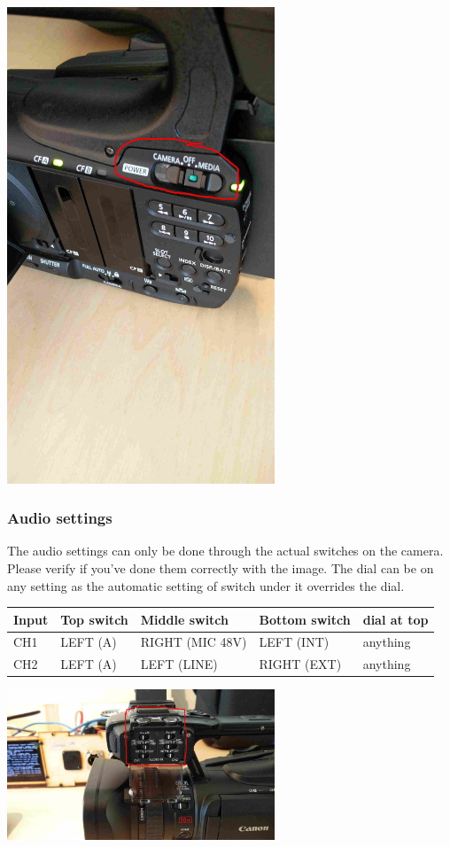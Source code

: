 \documentclass{article}
\begin{document}
\includegraphics[width = 80mm]{Canon03.jpg}

\subsubsection{Audio settings}
The audio settings can only be done through the actual switches on the camera. Please verify if you've done them correctly with the image. The dial can be on any setting as the automatic setting of switch under it overrides the dial.

\begin{tabular}{| l || l | l | l | l |}
Input & Top switch & Middle switch & Bottom switch & dial at top \\ \hline
CH1 & LEFT (A) & RIGHT (MIC 48V) & LEFT (INT) & anything \\
CH2 & LEFT (A) & LEFT (LINE) & RIGHT (EXT) & anything \\
\end{tabular}

\includegraphics[width = 80mm]{Canon04.jpg}
\end{document}
